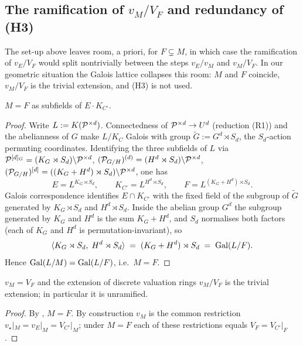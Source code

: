 \documentclass[11pt]{article}
\begin{document}
\subsection{The ramification of \texorpdfstring{$v_M/V_F$}{vM/VF} and
            redundancy of \texorpdfstring{(H3)}{(H3)}}
\label{subsec:vM-VF-ramification}

The set-up above leaves room, a priori, for $F \subsetneq M$, in which case the
ramification of $v_E/V_F$ would split nontrivially between the steps
$v_E/v_M$ and $v_M/V_F$.  In our geometric situation the Galois lattice
collapses this room: $M$ and $F$ coincide, $v_M / V_F$ is the trivial extension,
and (H3) is not used.

\begin{prop}\label{prop:M-equals-F}
$M = F$ as subfields of $E \cdot K_{C'}$.
\end{prop}

\begin{proof}
Write $L := K(\mathcal{P}^{\times d})$.  Connectedness of $\mathcal{P}^{\times d} \to U^d$
(reduction (R1)) and the abelianness of $G$ make $L/K_C$ Galois with group
$\widetilde G := G^d \rtimes S_d$, the $S_d$-action permuting coordinates.
Identifying the three subfields of $L$ via
$\mathcal{P}^{[d]_G} = (K_G \rtimes S_d) \backslash \mathcal{P}^{\times d}$,
$(\mathcal{P}_{G/H})^{(d)} = (H^d \rtimes S_d) \backslash \mathcal{P}^{\times d}$,
$(\mathcal{P}_{G/H})^{[d]} = ((K_G + H^d) \rtimes S_d) \backslash \mathcal{P}^{\times d}$, one
has
\[
E = L^{K_G \rtimes S_d}, \qquad
K_{C'} = L^{H^d \rtimes S_d}, \qquad
F = L^{(K_G + H^d) \rtimes S_d}.
\]
Galois correspondence identifies $E \cap K_{C'}$ with the fixed field of the
subgroup of $\widetilde G$ generated by $K_G \rtimes S_d$ and
$H^d \rtimes S_d$.  Inside the abelian group $G^d$ the subgroup generated by
$K_G$ and $H^d$ is the sum $K_G + H^d$, and $S_d$ normalises both factors
(each of $K_G$ and $H^d$ is permutation-invariant), so
\[
\langle K_G \rtimes S_d,\; H^d \rtimes S_d \rangle
   \;=\; (K_G + H^d) \rtimes S_d
   \;=\; \operatorname{Gal}(L/F).
\]
Hence $\operatorname{Gal}(L/M) = \operatorname{Gal}(L/F)$, i.e.\ $M = F$.
\end{proof}

\begin{cor}\label{cor:vM-trivial}
$v_M = V_F$ and the extension of discrete valuation rings $v_M / V_F$ is the
trivial extension; in particular it is unramified.
\end{cor}

\begin{proof}
By , $M = F$.  By construction $v_M$ is the common
restriction $v_\star|_M = v_E|_M = V_{C'}|_M$; under $M = F$ each of these
restrictions equals $V_F = V_{C'}|_F$.
\end{proof}


\printbibliography
\end{document}
